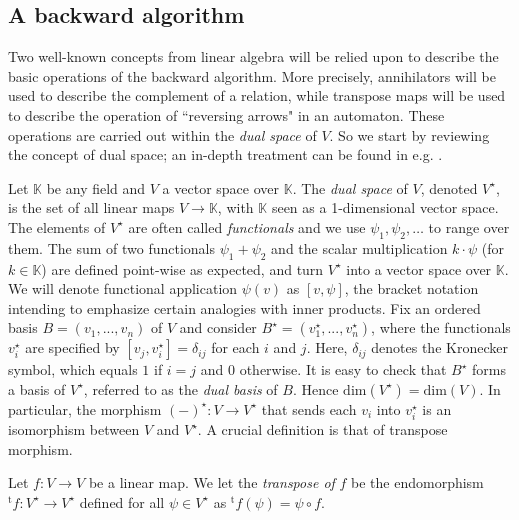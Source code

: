 \documentclass[3p]{elsarticle}
\newcommand{\comp}{\circ}               %
\newcommand{\dimn}{\mathrm{dim}}   %
\newcommand{\transp}{{}^{\mathrm{t}}}  %
\newcommand{\K}{\mathbb{K}}            %
\newcommand{\dual}[1]{ {#1}^\star}     %
\newcommand{\lpar}{\langle}
\newcommand{\rpar}{\rangle}
\begin{document}
\subsection{A backward algorithm}\label{sec:back}
Two  well-known concepts from linear algebra will be relied upon to describe
the basic operations of the backward algorithm. More precisely,  annihilators will be used to
describe the complement of a relation, while  transpose maps will be used  to describe
the operation of  ``reversing arrows" in an automaton. These
operations are carried out within the \emph{dual space} of $V$. So
we start by reviewing the concept of {dual space}; an in-depth
treatment can be found in e.g. \cite{Halmos}.

Let $\K$ be any field and $V$ a vector space over $\K$. The
\emph{dual space} of $V$, denoted $\dual V $, is the set of all
linear maps $V\rightarrow \K$, with $\K$ seen as a 1-dimensional
vector space. The elements of $\dual V$ are often called
\emph{functionals} and we use $\psi_1,\psi_2, \dots$ to range over
them. The sum of two functionals $\psi_1+\psi_2$ and the scalar
multiplication $k\cdot \psi$ (for $k\in \K$)  are defined point-wise
as expected, and turn $\dual V$ into a vector space over $\K$. We
will denote functional application $\psi(v)$ as $[v,\psi]$, the
bracket notation intending to emphasize certain analogies with inner
products. Fix an ordered basis $B=(v_1,...,v_n)$ of $V$ and consider
$\dual B= (\dual v_1,...,\dual v_n)$, where the functionals $\dual
v_i$ are specified by $[v_j, \dual v_i]= \delta_{ij}$ for each $i$
and $j$. Here, $\delta_{ij}$ denotes the Kronecker symbol, which
equals $1$ if $i=j$ and 0 otherwise. It is easy to check that $\dual
B$ forms a basis of $\dual V$, referred to as the \emph{dual basis}
of $B$. Hence $\dimn(\dual V)=\dimn(V)$. In particular, the morphism
$\dual{(-)} \colon V\rightarrow \dual V$ that sends each $v_i$ into
$\dual v_i$ is an isomorphism between $V$ and $\dual V$.
A crucial definition is that of   transpose morphism.


\begin{definition}
Let $f \colon  V\rightarrow V$ be a linear map.  We let the
\emph{transpose of} $f$  be the endomorphism $\transp f \colon \dual
V\rightarrow \dual V$  defined for all $\psi\in\dual V$ as $\transp
f(\psi)= \psi\comp f$.

\end{definition}
\end{document}
